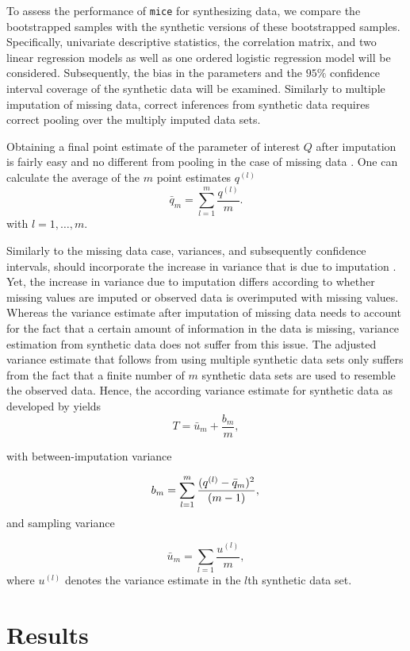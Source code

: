 \documentclass[psych,article,submit,moreauthors,pdftex]{mdpi}
\begin{document}
To assess the performance of \texttt{mice} for synthesizing data, we
compare the bootstrapped samples with the synthetic versions of these
bootstrapped samples. Specifically, univariate descriptive statistics,
the correlation matrix, and two linear regression models as well as one
ordered logistic regression model will be considered. Subsequently, the
bias in the parameters and the \(95\%\) confidence interval coverage of
the synthetic data will be examined. Similarly to multiple imputation of
missing data, correct inferences from synthetic data requires correct
pooling over the multiply imputed data sets.

Obtaining a final point estimate of the parameter of interest \(Q\)
after imputation is fairly easy and no different from pooling in the
case of missing data \citep{rubin_multiple_1987}. One can calculate the
average of the \(m\) point estimates \(q^{(l)}\) \[
\bar{q}_m = \sum_{l = 1}^m \frac{q^{(l)}}{m}.
\] with \(l = 1, \dots, m\).

Similarly to the missing data case, variances, and subsequently
confidence intervals, should incorporate the increase in variance that
is due to imputation
\citep{reiter_partially_inference_2003, drechsler_synthetic_2011}. Yet,
the increase in variance due to imputation differs according to whether
missing values are imputed or observed data is overimputed with missing
values. Whereas the variance estimate after imputation of missing data
needs to account for the fact that a certain amount of information in
the data is missing, variance estimation from synthetic data does not
suffer from this issue. The adjusted variance estimate that follows from
using multiple synthetic data sets only suffers from the fact that a
finite number of \(m\) synthetic data sets are used to resemble the
observed data. Hence, the according variance estimate for synthetic data
as developed by \citet{reiter_partially_inference_2003} yields \[
T = \bar{u}_m + \frac{b_m}{m},
\]

with between-imputation variance

\[
b_m = \sum_{l = 1}^m \frac{(q^{(l)} - \bar{q}_m)^2}{(m - 1)}, \\
\] and sampling variance

\[
\bar{u}_m = \sum_{l = 1} \frac{u^{(l)}}{m},
\] where \(u^{(l)}\) denotes the variance estimate in the \(l\)th
synthetic data set.

\hypertarget{results}{%
\section{Results}\label{results}}
\end{document}
